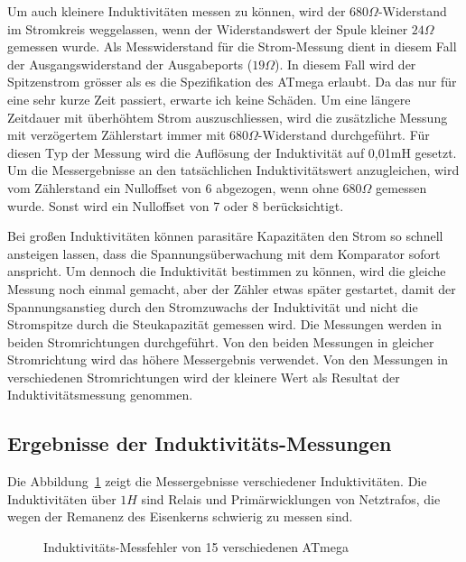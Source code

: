Um auch kleinere Induktivitäten messen zu können, wird der \(680 \Omega\)-Widerstand im Stromkreis weggelassen,
wenn der Widerstandswert der Spule kleiner \(24 \Omega\) gemessen wurde. Als Messwiderstand für die Strom-Messung
dient in diesem Fall der Ausgangswiderstand der Ausgabeports (\(19 \Omega\)). In diesem Fall wird der Spitzenstrom grösser
als es die Spezifikation des ATmega erlaubt. Da das nur für eine sehr kurze Zeit passiert, erwarte ich keine Schäden.
Um eine längere Zeitdauer mit überhöhtem Strom auszuschliessen, wird die zusätzliche Messung mit 
verzögertem Zählerstart immer mit \(680 \Omega\)-Widerstand durchgeführt.
Für diesen Typ der Messung wird die Auflösung der Induktivität auf 0,01mH gesetzt.
Um die Messergebnisse an den tatsächlichen Induktivitätswert anzugleichen, wird vom Zählerstand ein
Nulloffset von 6 abgezogen, wenn ohne \(680 \Omega\) gemessen wurde. Sonst wird ein Nulloffset von 7 oder 8 berücksichtigt.


Bei großen Induktivitäten können parasitäre Kapazitäten den Strom so schnell ansteigen lassen, dass
die Spannungsüberwachung mit dem Komparator sofort anspricht. Um dennoch die Induktivität bestimmen zu
können, wird die gleiche Messung noch einmal gemacht, aber der Zähler etwas später gestartet, damit
der Spannungsanstieg durch den Stromzuwachs der Induktivität und nicht die Stromspitze durch die
Steukapazität gemessen wird.
Die Messungen werden in beiden Stromrichtungen durchgeführt.
Von den beiden Messungen in gleicher Stromrichtung wird das höhere Messergebnis verwendet.
Von den Messungen in verschiedenen Stromrichtungen wird der kleinere Wert als Resultat der Induktivitätsmessung genommen.

\subsection{Ergebnisse der Induktivitäts-Messungen}
Die Abbildung~\ref{fig:Induct328p} zeigt die Messergebnisse verschiedener Induktivitäten.
Die Induktivitäten über \(1 H\) sind Relais und Primärwicklungen von Netztrafos, die wegen
der Remanenz des Eisenkerns schwierig zu messen sind.

\begin{figure}[H]
\centering

\caption{Induktivitäts-Messfehler von 15 verschiedenen ATmega}
\label{fig:Induct328p}
\end{figure}
